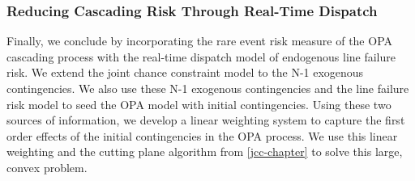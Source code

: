 \subsubsection{Reducing Cascading Risk Through Real-Time Dispatch}
Finally, we conclude by incorporating the rare event risk measure of the OPA cascading process with the real-time dispatch model of endogenous line failure risk.  We extend the joint chance constraint model to the N-1 exogenous contingencies.  We also use these N-1 exogenous contingencies and the line failure risk model to seed the OPA model with initial contingencies.  Using these two sources of information, we develop a linear weighting system to capture the first order effects of the initial contingencies in the OPA process.  We use this linear weighting and the cutting plane algorithm from \cref{jcc-chapter} to solve this large, convex problem.
